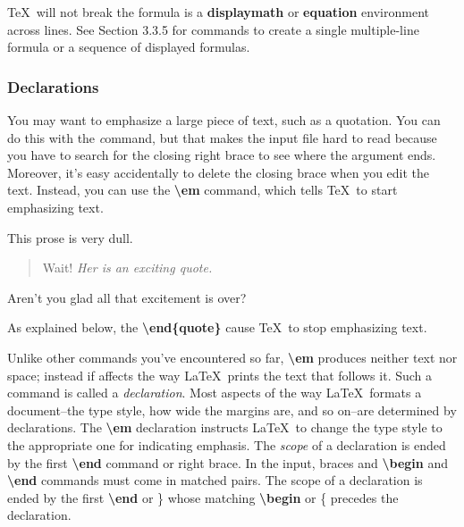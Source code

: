 \documentclass[twocolumn]{article}        %
\begin{document}
\TeX\ will not break the formula is a \textbf{displaymath} or \textbf{equation} environment across lines.
See Section 3.3.5 for commands to create a single multiple-line formula or a sequence of displayed formulas.

\subsubsection{Declarations}

You may want to emphasize a large piece of text, such as a quotation. You can do this with the \emph command, 
but that makes the input file hard to read because you have to search for the closing right brace to see where 
the argument ends. Moreover, it's easy accidentally to delete the closing brace when you edit the text. Instead, 
you can use the \textbf{\textbackslash em} command, which tells \TeX\ to start emphasizing text.

\hfill \break \noindent
This prose is very dull.
\begin{quote}
Wait! \em Her is an exciting quote.
\end{quote}
Aren't you glad all that excitement is over?

\hfill \break \noindent
As explained below, the \textbf{\textbackslash end\{quote\}} cause \TeX\ to stop emphasizing text.

Unlike other commands you've encountered so far, \textbf{\textbackslash em} produces neither text nor space;
instead if affects the way \LaTeX\ prints the text that follows it. Such a command is called a 
\emph{declaration}. Most aspects of the way \LaTeX\ formats a document--the type style, how wide the margins are,
and so on--are determined by declarations.
The \textbf{\textbackslash em} declaration instructs \LaTeX\ to change the type style to the appropriate one 
for indicating emphasis.
The \emph{scope} of a declaration is ended by the first \textbf{\textbackslash end} command or right brace.
In the input, braces and \textbf{\textbackslash begin} and \textbf{\textbackslash end} commands must come in
matched pairs. The scope of a declaration is ended by the first \textbf{\textbackslash end} or \} whose matching 
\textbf{\textbackslash begin} or \{ precedes the declaration.
\end{document}
